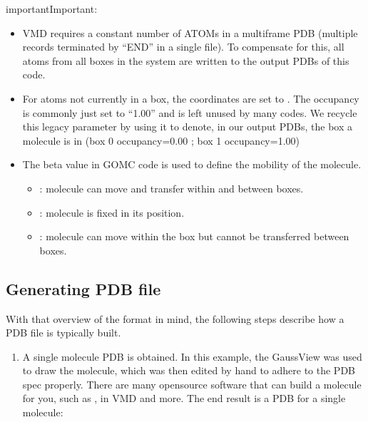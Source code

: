 \documentclass[letterpaper,10pt,english]{sphinxmanual}
\begin{document}
\begin{sphinxadmonition}{important}{Important:}\begin{itemize}
\item {} 
\sphinxAtStartPar
VMD requires a constant number of ATOMs in a multi\sphinxhyphen{}frame PDB (multiple records terminated by “END” in a single file). To compensate for this, all atoms
from all boxes in the system are written to the output PDBs of this code.

\item {} 
\sphinxAtStartPar
For atoms not currently in a box, the coordinates are set to . The occupancy is commonly just set to “1.00” and is left unused by
many codes. We recycle this legacy parameter by using it to denote, in our output PDBs, the box a molecule is in (box 0 occupancy=0.00 ; box 1 occupancy=1.00)

\item {} 
\sphinxAtStartPar
The beta value in GOMC code is used to define the mobility of the molecule.
\begin{itemize}
\item {} 
\sphinxAtStartPar
{}: molecule can move and transfer within and between boxes.

\item {} 
\sphinxAtStartPar
{}: molecule is fixed in its position.

\item {} 
\sphinxAtStartPar
{}: molecule can move within the box but cannot be transferred between boxes.

\end{itemize}

\end{itemize}
\end{sphinxadmonition}


\subsection{Generating PDB file}
\label{\detokenize{input_file:generating-pdb-file}}
\sphinxAtStartPar
With that overview of the format in mind, the following steps describe how a PDB file is typically built.
\begin{enumerate}
%
\item {} 
\sphinxAtStartPar
A single molecule PDB is obtained. In this example, the GaussView was used to draw the molecule, which was then edited by hand to adhere
to the PDB spec properly. There are many open\sphinxhyphen{}source software that can build a molecule for you, such as  ,
 in VMD and more. The end result is a PDB for a single molecule:

\end{enumerate}
\end{document}
